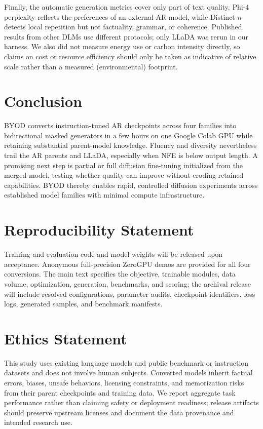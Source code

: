 \documentclass{article}
\newcommand{\method}{BYOD}
\begin{document}
Finally, the automatic generation metrics cover only part of text quality. Phi-4 perplexity reflects the preferences of an external AR model, while Distinct-$n$ detects local repetition but not factuality, grammar, or coherence. Published results from other DLMs use different protocols; only LLaDA was rerun in our harness. We also did not measure energy use or carbon intensity directly, so claims on cost or resource efficiency should only be taken as indicative of relative scale rather than a measured (environmental) footprint.

\section{Conclusion}

\method{} converts instruction-tuned AR checkpoints across four families into bidirectional masked generators in a few hours on one Google Colab GPU while retaining substantial parent-model knowledge. Fluency and diversity nevertheless trail the AR parents and LLaDA, especially when NFE is below output length. A promising next step is partial or full diffusion fine-tuning initialized from the merged model, testing whether quality can improve without eroding retained capabilities. BYOD thereby enables rapid, controlled diffusion experiments across established model families with minimal compute infrastructure.


\section*{Reproducibility Statement}

Training and evaluation code and model weights will be released upon acceptance. Anonymous full-precision ZeroGPU demos are provided for all four conversions. The main text specifies the objective, trainable modules, data volume, optimization, generation, benchmarks, and scoring; the archival release will include resolved configurations, parameter audits, checkpoint identifiers, loss logs, generated samples, and benchmark manifests.

\section*{Ethics Statement}

This study uses existing language models and public benchmark or instruction datasets and does not involve human subjects. Converted models inherit factual errors, biases, unsafe behaviors, licensing constraints, and memorization risks from their parent checkpoints and training data. We report aggregate task performance rather than claiming safety or deployment readiness; release artifacts should preserve upstream licenses and document the data provenance and intended research use.
\end{document}
